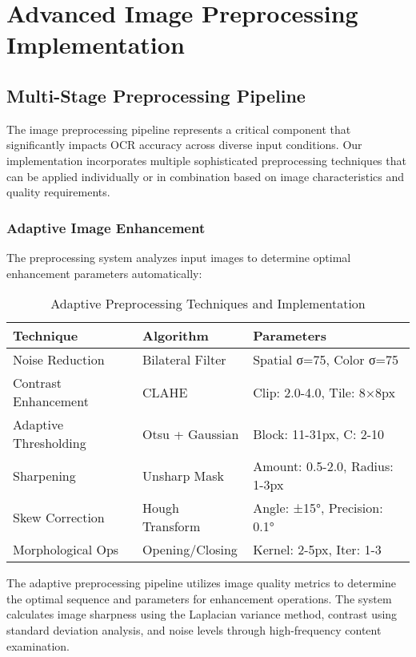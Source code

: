 \section{Advanced Image Preprocessing Implementation}

\subsection{Multi-Stage Preprocessing Pipeline}

The image preprocessing pipeline represents a critical component that significantly impacts OCR accuracy across diverse input conditions. Our implementation incorporates multiple sophisticated preprocessing techniques that can be applied individually or in combination based on image characteristics and quality requirements.

\subsubsection{Adaptive Image Enhancement}

The preprocessing system analyzes input images to determine optimal enhancement parameters automatically:

\begin{table}[H]
\centering
\caption{Adaptive Preprocessing Techniques and Implementation}
\label{tab:preprocessing_adaptive}
{\begin{tabular}{lll}
\toprule
\textbf{Technique} & \textbf{Algorithm} & \textbf{Parameters} \\
\midrule
Noise Reduction & Bilateral Filter & Spatial σ=75, Color σ=75 \\
Contrast Enhancement & CLAHE & Clip: 2.0-4.0, Tile: 8×8px \\
Adaptive Thresholding & Otsu + Gaussian & Block: 11-31px, C: 2-10 \\
Sharpening & Unsharp Mask & Amount: 0.5-2.0, Radius: 1-3px \\
Skew Correction & Hough Transform & Angle: ±15°, Precision: 0.1° \\
Morphological Ops & Opening/Closing & Kernel: 2-5px, Iter: 1-3 \\
\bottomrule
\end{tabular}}
\end{table}

The adaptive preprocessing pipeline utilizes image quality metrics to determine the optimal sequence and parameters for enhancement operations. The system calculates image sharpness using the Laplacian variance method, contrast using standard deviation analysis, and noise levels through high-frequency content examination.

